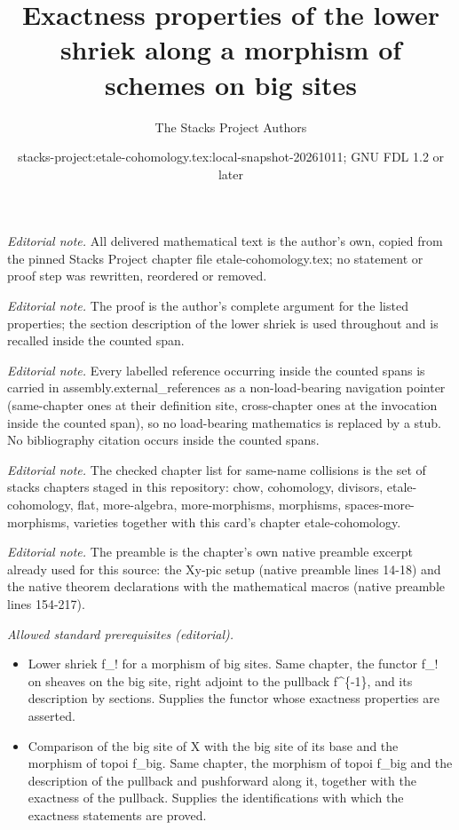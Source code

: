 \documentclass[10pt,a4paper]{amsart}
\title{Exactness properties of the lower shriek along a morphism of schemes on big sites}
\author{The Stacks Project Authors}
\date{stacks-project:etale-cohomology.tex:local-snapshot-20261011; GNU FDL 1.2 or later}
\theoremstyle{plain}
\theoremstyle{definition}
\theoremstyle{remark}
\numberwithin{equation}{subsection}
\begin{document}
\maketitle
\noindent\textit{Editorial note.} All delivered mathematical text is the author's own, copied from the pinned Stacks Project chapter file etale-cohomology.tex; no statement or proof step was rewritten, reordered or removed.\par\medskip
\noindent\textit{Editorial note.} The proof is the author's complete argument for the listed properties; the section description of the lower shriek is used throughout and is recalled inside the counted span.\par\medskip
\noindent\textit{Editorial note.} Every labelled reference occurring inside the counted spans is carried in assembly.external\_references as a non-load-bearing navigation pointer (same-chapter ones at their definition site, cross-chapter ones at the invocation inside the counted span), so no load-bearing mathematics is replaced by a stub. No bibliography citation occurs inside the counted spans.\par\medskip
\noindent\textit{Editorial note.} The checked chapter list for same-name collisions is the set of stacks chapters staged in this repository: chow, cohomology, divisors, etale-cohomology, flat, more-algebra, more-morphisms, morphisms, spaces-more-morphisms, varieties together with this card's chapter etale-cohomology.\par\medskip
\noindent\textit{Editorial note.} The preamble is the chapter's own native preamble excerpt already used for this source: the Xy-pic setup (native preamble lines 14-18) and the native theorem declarations with the mathematical macros (native preamble lines 154-217).\par\medskip
\noindent\textit{Allowed standard prerequisites (editorial).}\begin{itemize}
\item Lower shriek f\_! for a morphism of big sites. Same chapter, the functor f\_! on sheaves on the big site, right adjoint to the pullback f\textasciicircum{}\{-1\}, and its description by sections. Supplies the functor whose exactness properties are asserted.
\item Comparison of the big site of X with the big site of its base and the morphism of topoi f\_big. Same chapter, the morphism of topoi f\_big and the description of the pullback and pushforward along it, together with the exactness of the pullback. Supplies the identifications with which the exactness statements are proved.
\end{itemize}\medskip
\end{document}
